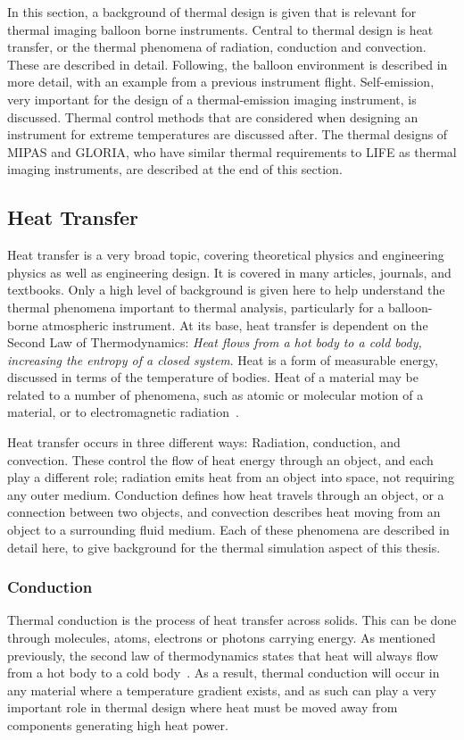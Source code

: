 In this section, a background of thermal design is given that is relevant for thermal imaging balloon borne instruments. Central to thermal design is heat transfer, or the thermal phenomena of radiation, conduction and convection. These are described in detail. Following, the balloon environment is described in more detail, with an example from a previous instrument flight. Self-emission, very important for the design of a thermal-emission imaging instrument, is discussed. Thermal control methods that are considered when designing an instrument for extreme temperatures are discussed after. The thermal designs of MIPAS and GLORIA, who have similar thermal requirements to LIFE as thermal imaging instruments, are described at the end of this section.

\subsection{Heat Transfer}\label{heat_transfer}
Heat transfer is a very broad topic, covering theoretical physics and engineering physics as well as engineering design. It is covered in many articles, journals, and textbooks. Only a high level of background is given here to help understand the thermal phenomena important to thermal analysis, particularly for a balloon-borne atmospheric instrument. At its base, heat transfer is dependent on the Second Law of Thermodynamics: \textit{Heat flows from a hot body to a cold body, increasing the entropy of a closed system}. Heat is a form of measurable energy, discussed in terms of the temperature of bodies. Heat of a material may be related to a number of phenomena, such as atomic or molecular motion of a material, or to electromagnetic radiation~\citep{Heat_Transfer_telescope}.

Heat transfer occurs in three different ways: Radiation, conduction, and convection. These control the flow of heat energy through an object, and each play a different role; radiation emits heat from an object into space, not requiring any outer medium. Conduction defines how heat travels through an object, or a connection between two objects, and convection describes heat moving from an object to a surrounding fluid medium. Each of these phenomena are described in detail here, to give background for the thermal simulation aspect of this thesis.

\subsubsection{Conduction}\label{Conduction_sec}
Thermal conduction is the process of heat transfer across solids. This can be done through molecules, atoms, electrons or photons carrying energy. As mentioned previously, the second law of thermodynamics states that heat will always flow from a hot body to a cold body~\citep{Heat_Transfer_Basics}. As a result, thermal conduction will occur in any material where a temperature gradient exists, and as such can play a very important role in thermal design where heat must be moved away from components generating high heat power.

